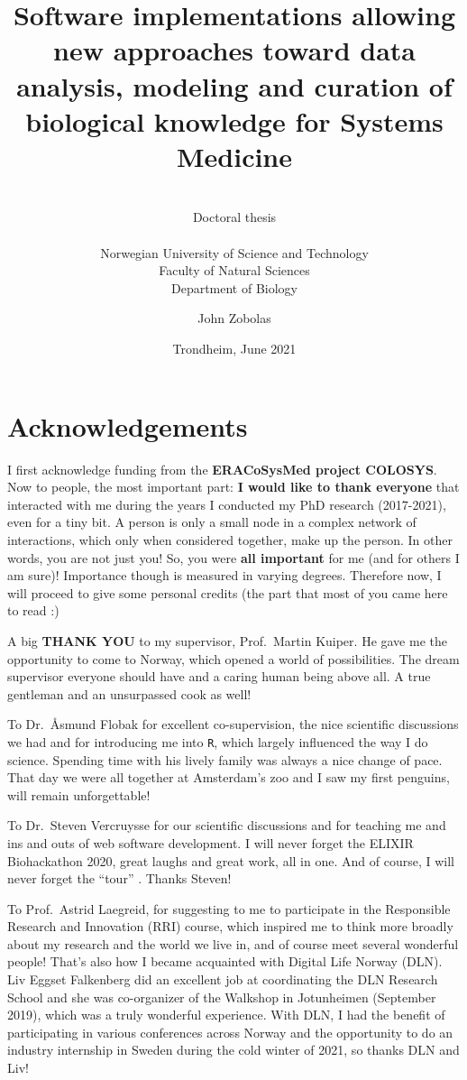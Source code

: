 \documentclass[
  12pt,
]{book}
\title{Software implementations allowing new approaches toward data analysis, modeling and curation of biological knowledge for Systems Medicine}
\subtitle{~\\
Doctoral thesis\\
\hspace*{0.333em}\\
Norwegian University of Science and Technology\\
Faculty of Natural Sciences\\
Department of Biology}
\author{John Zobolas}
\date{Trondheim, June 2021}
\begin{document}
\maketitle

{
\hypersetup{linkcolor=}
\setcounter{tocdepth}{1}
\tableofcontents
}
\hypertarget{acknowledgements}{%
\chapter*{Acknowledgements}\label{acknowledgements}}

\vspace{-30pt}
\indent

I first acknowledge funding from the \textbf{ERACoSysMed project COLOSYS}. Now to people, the most important part: \textbf{I would like to thank everyone} that interacted with me during the years I conducted my PhD research (2017-2021), even for a tiny bit. A person is only a small node in a complex network of interactions, which only when considered together, make up the person. In other words, you are not just you! So, you were \textbf{all important} for me (and for others I am sure)! Importance though is measured in varying degrees. Therefore now, I will proceed to give some personal credits (the part that most of you came here to read :)

A big \textbf{THANK YOU} to my supervisor, Prof.~Martin Kuiper. He gave me the opportunity to come to Norway, which opened a world of possibilities. The dream supervisor everyone should have and a caring human being above all. A true gentleman and an unsurpassed cook as well!

To Dr.~Åsmund Flobak for excellent co-supervision, the nice scientific discussions we had and for introducing me into \texttt{R}, which largely influenced the way I do science. Spending time with his lively family was always a nice change of pace. That day we were all together at Amsterdam's zoo and I saw my first penguins, will remain unforgettable!

To Dr.~Steven Vercruysse for our scientific discussions and for teaching me and ins and outs of web software development. I will never forget the ELIXIR Biohackathon 2020, great laughs and great work, all in one. And of course, I will never forget the ``tour'' . Thanks Steven!

To Prof.~Astrid Laegreid, for suggesting to me to participate in the Responsible Research and Innovation (RRI) course, which inspired me to think more broadly about my research and the world we live in, and of course meet several wonderful people! That's also how I became acquainted with Digital Life Norway (DLN). Liv Eggset Falkenberg did an excellent job at coordinating the DLN Research School and she was co-organizer of the Walkshop in Jotunheimen (September 2019), which was a truly wonderful experience. With DLN, I had the benefit of participating in various conferences across Norway and the opportunity to do an industry internship in Sweden during the cold winter of 2021, so thanks DLN and Liv!
\end{document}
